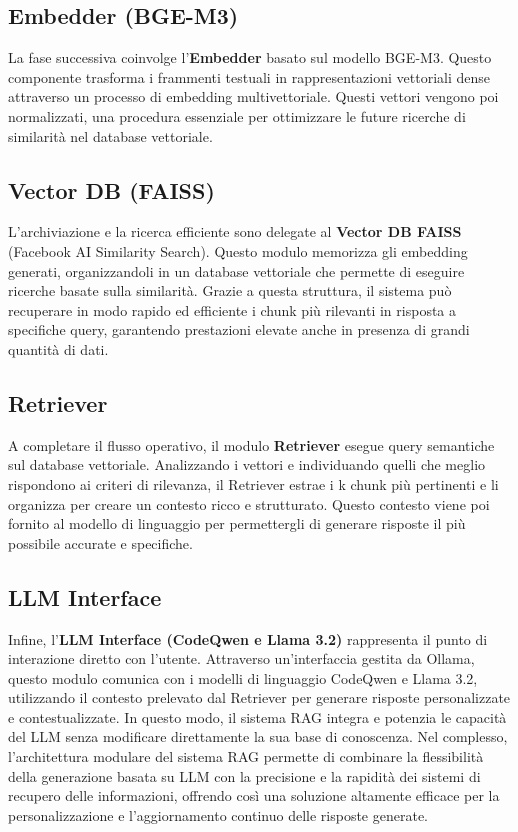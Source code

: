 \documentclass[12pt,a4paper,openright,twoside]{book}
\begin{document}
\subsection{Embedder (BGE-M3)}
La fase successiva coinvolge l'\textbf{Embedder} basato sul modello BGE-M3. Questo componente trasforma i frammenti testuali in rappresentazioni vettoriali dense attraverso un processo di embedding multivettoriale.
Questi vettori vengono poi normalizzati, una procedura essenziale per ottimizzare le future ricerche di similarità nel database vettoriale.
\subsection{Vector DB (FAISS)}
L'archiviazione e la ricerca efficiente sono delegate al \textbf{Vector DB FAISS} (Facebook AI Similarity Search). 
Questo modulo memorizza gli embedding generati, organizzandoli in un database vettoriale che permette di eseguire ricerche basate sulla similarità. Grazie a questa struttura, il sistema può recuperare in modo rapido ed efficiente i chunk più rilevanti in risposta a specifiche query, garantendo prestazioni elevate anche in presenza di grandi quantità di dati.
\subsection{Retriever}
A completare il flusso operativo, il modulo \textbf{Retriever} esegue query semantiche sul database vettoriale. Analizzando i vettori e individuando quelli che meglio rispondono ai criteri di rilevanza, il Retriever estrae i k chunk più pertinenti e li organizza per creare un contesto ricco e strutturato. Questo contesto viene poi fornito al modello di linguaggio per permettergli di generare risposte il più possibile accurate e specifiche.
\subsection{LLM Interface}
Infine, l'\textbf{LLM Interface (CodeQwen e Llama 3.2)} rappresenta il punto di interazione diretto con l'utente. Attraverso un'interfaccia gestita da Ollama, questo modulo comunica con i modelli di linguaggio CodeQwen e Llama 3.2, utilizzando il contesto prelevato dal Retriever per generare risposte personalizzate e contestualizzate. In questo modo, il sistema RAG integra e potenzia le capacità del LLM senza modificare direttamente la sua base di conoscenza.
Nel complesso, l'architettura modulare del sistema RAG permette di combinare la flessibilità della generazione basata su LLM con la precisione e la rapidità dei sistemi di recupero delle informazioni, offrendo così una soluzione altamente efficace per la personalizzazione e l'aggiornamento continuo delle risposte generate.
\end{document}
